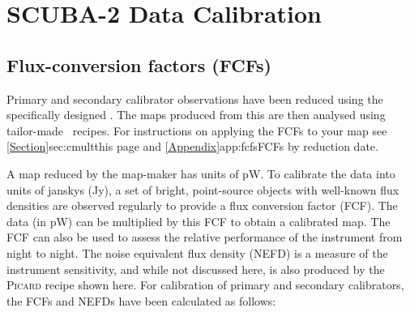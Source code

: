 \chapter{SCUBA-2 Data Calibration}
\label{app:cal}

\section{Flux-conversion factors (FCFs)}
\label{app:fcf}

Primary and secondary calibrator observations have been reduced using
the specifically designed .  The
maps produced from this are then analysed using tailor-made \picard\
recipes. For instructions on applying the FCFs to your map see
\cref{Section}{sec:cmult}{this page} and
\cref{Appendix}{app:fcfs}{FCFs by reduction date}.

A map reduced by the map-maker has units of pW. To calibrate the data
into units of janskys (Jy), a set of bright, point-source objects with
well-known flux densities are observed regularly to provide a flux
conversion factor (FCF). The data (in pW) can be multiplied by this
FCF to obtain a calibrated map. The FCF can also be used to assess the
relative performance of the instrument from night to night. The noise
equivalent flux density (NEFD) is a measure of the instrument
sensitivity, and while not discussed here, is also produced by the
\textsc{Picard} recipe shown here. For calibration of primary and
secondary calibrators, the FCFs and NEFDs have been calculated as
follows:

